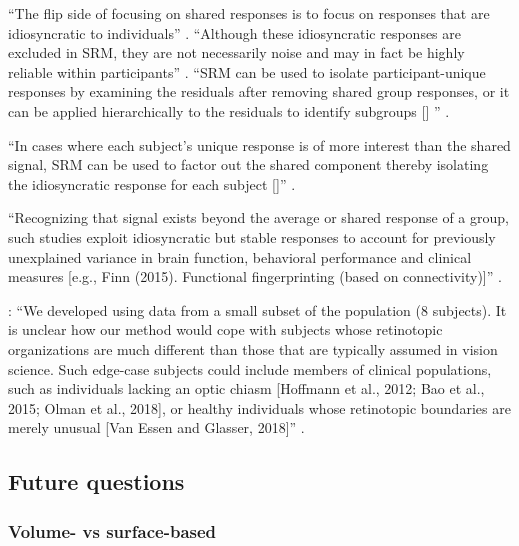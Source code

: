 ``The flip side of focusing on shared responses is to focus on responses that
are idiosyncratic to individuals'' \citep{cohen2017computational}.
%
``Although these idiosyncratic responses are excluded in SRM, they are not
necessarily noise and may in fact be highly reliable within participants''
\citep{cohen2017computational}.
%
``SRM can be used to isolate participant-unique responses by examining the
residuals after removing shared group responses, or it can be applied
hierarchically to the residuals to identify subgroups [\citet{chen2017shared}]
'' \citep{cohen2017computational}.

%
``In cases where each subject's unique response is of more interest than the
shared signal, SRM can be used to factor out the shared component thereby
isolating the idiosyncratic response for each subject
[\citep{chen2015reduced}]'' \citep{kumar2020brainiak}.


%
``Recognizing that signal exists beyond the average or shared response of a
group, such studies exploit idiosyncratic but stable responses to account for
previously unexplained variance in brain function, behavioral performance and
clinical measures [e.g., Finn (2015). Functional fingerprinting (based on
connectivity)]'' \citep{cohen2017computational}.


\citet{benson2018bayesian}: ``We developed using data from a small subset of the
population (8 subjects).
%
It is unclear how our method would cope with subjects whose retinotopic
organizations are much different than those that are typically assumed in vision
science.
%
Such edge-case subjects could include members of clinical populations, such as
individuals lacking an optic chiasm [Hoffmann et al., 2012; Bao et al., 2015;
Olman et al., 2018], or healthy individuals whose retinotopic boundaries are
merely unusual [Van Essen and Glasser, 2018]'' \citep{benson2018bayesian}.



\subsection{Future questions}



\subsubsection{Volume- vs surface-based}


